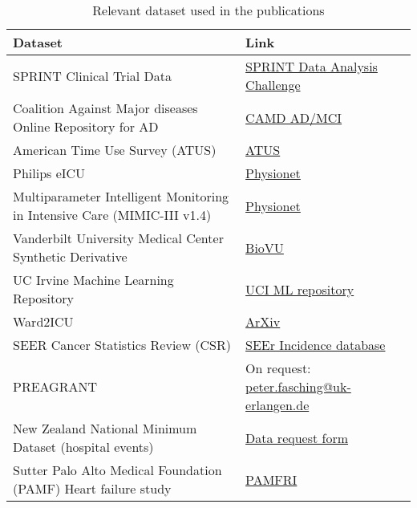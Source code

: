 \begin{table}[H]
    \footnotesize
    \setlength{\extrarowheight}{0.35em}
    \caption{Relevant dataset used in the publications\label{tab:5:datasets}}
    \begin{tabularx}{\textwidth}{@{}Xp{5cm}@{}}\toprule
    Dataset & Link\\\midrule
    
    SPRINT Clinical Trial Data \cite{wright2016randomized} 
    & \href{https://challenge.nejm.org/pages/home}{SPRINT Data Analysis Challenge}\\
    
    Coalition Against Major diseases Online Repository for AD \cite{Neville_2015} 
    &\href{https://c-path.org/programs/dcc/projects/alzheimers-disease/coalition-against-major-diseases-consortium-database-camd-admci/}{CAMD AD/MCI}\\
     
    American Time Use Survey (ATUS) \cite{us_bureau_of_labor_statistics_american_nodate}
    & \href{https://www.bls.gov/tus/}{ATUS}\\

    Philips eICU \cite{pollard2018eicu}
    & \href{https://physionet.org}{Physionet \cite{Goldberger_2000}}\\
    
    Multiparameter Intelligent Monitoring in Intensive Care (MIMIC-III v1.4) \cite{Johnson_2016}
    & \href{https://mimic.physionet.org}{Physionet} \cite{Goldberger_2000}\\
    
    Vanderbilt University Medical Center Synthetic Derivative \cite{Roden_2008}   
    & \href{https://victr.vumc.org/biovu-description/}{BioVU}\\
    
    UC Irvine Machine Learning Repository \cite{Dua:2019}  
    & \href{http://archive.ics.uci.edu/ml/index.php }{UCI ML repository}\\
    
    Ward2ICU \cite{severo2019ward2icu} 
    & \href{https://arxiv.org/abs/1910.00752}{ArXiv}\\
    
    SEER Cancer Statistics Review (CSR) \cite{noone2018cronin} 
    & \href{https://seer.cancer.gov/data/access.html}{SEEr Incidence database}\\
    
    PREAGRANT \cite{Fasching_2015} & 
    On request: \href{mailto:peter.fasching@uk-erlangen.de}{peter.fasching@uk-erlangen.de} \\
    
    New Zealand National Minimum Dataset (hospital events) \cite{events}
    & \href{https://www.health.govt.nz/nz-health-statistics/access-and-use/data-request-form}{Data request form}\\
    
    Sutter Palo Alto Medical Foundation (PAMF)  Heart failure study \cite{Choi2017-nt} 
    & \href{https://www.sutterhealth.org/research/pamfri}{PAMFRI}\\
    
    \bottomrule
    \end{tabularx}
\end{table}